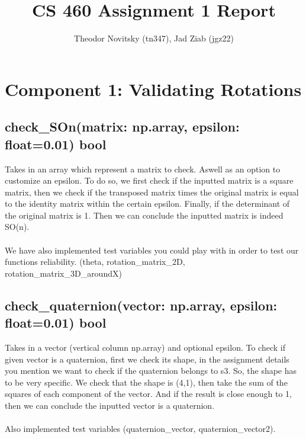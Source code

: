 \documentclass[12pt]{article}
\title{CS 460 Assignment 1 Report}
\author{Theodor Novitsky (tn347), Jad Ziab (jgz22)}
\date{}
\begin{document}
\maketitle

\section*{Component 1: Validating Rotations}
\subsection*{check\_SOn(matrix: np.array, epsilon: float=0.01) \rightarrow{} bool}
Takes in an array which represent a matrix to check. Aswell as an option to customize an epsilon. To do so, we first check if the inputted matrix is a square matrix, then we check if the transposed matrix times the original matrix is equal to the identity matrix within the certain epsilon. Finally, if the determinant of the original matrix is 1. Then we can conclude the inputted matrix is indeed SO(n).
\\ \\
We have also implemented test variables you could play with in order to test our functions reliability. (theta, rotation\_matrix\_2D, rotation\_matrix\_3D\_aroundX)


\subsection*{check\_quaternion(vector: np.array, epsilon: float=0.01) \rightarrow{} bool}
Takes in a vector (vertical column np.array) and optional epsilon. To check if given vector is a quaternion, first we check its shape, in the assignment details you mention we want to check if the quaternion belongs to s3. So, the shape has to be very specific. We check that the shape is (4,1), then take the sum of the squares of each component of the vector. And if the result is close enough to 1, then we can conclude the inputted vector is a quaternion.
\\ \\
Also implemented test variables (quaternion\_vector, quaternion\_vector2).
\end{document}
